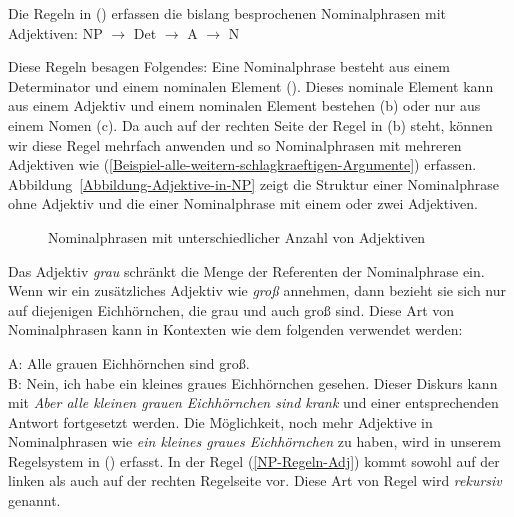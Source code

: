 %
Die Regeln in () erfassen die bislang besprochenen Nominalphrasen mit Adjektiven:
\eal
\label{NP-Regeln}
\ex NP $\to$ Det \nbar
\ex\label{NP-Regeln-Adj} \nbar $\to$ A \nbar
\ex\label{NP-Regeln-Nbar-N} \nbar $\to$ N
\zl

\noindent
Diese Regeln besagen Folgendes: Eine Nominalphrase besteht aus einem Determinator und einem nominalen Element (\nbar). Dieses nominale Element
kann aus einem Adjektiv und einem nominalen Element bestehen (b) oder nur aus einem Nomen (c). Da \nbar auch auf der rechten Seite
der Regel in (b) steht, können wir diese Regel mehrfach anwenden und so Nominalphrasen mit mehreren Adjektiven wie
(\ref{Beispiel-alle-weitern-schlagkraeftigen-Argumente}) erfassen. Abbildung~\vref{Abbildung-Adjektive-in-NP} zeigt die Struktur einer Nominalphrase
ohne Adjektiv und die einer Nominalphrase mit einem oder zwei Adjektiven.
\begin{figure}
\hfill
{}
%
\hfill
{}
%
\caption{\label{Abbildung-Adjektive-in-NP}Nominalphrasen mit unterschiedlicher Anzahl von Adjektiven}
\end{figure}%
Das Adjektiv \emph{grau} schränkt die Menge der Referenten der Nominalphrase ein. Wenn wir ein
zusätzliches Adjektiv wie \emph{groß} annehmen, dann bezieht sie sich nur auf diejenigen Eichhörnchen, die grau
und auch groß sind. Diese Art von Nominalphrasen kann in Kontexten wie dem folgenden verwendet werden:

\ea
\label{Beispiel-Iteration-Adjektive}
A: Alle grauen Eichhörnchen sind groß.\\
B: Nein, ich habe ein kleines graues Eichhörnchen gesehen.
\z
Dieser Diskurs kann mit \emph{Aber alle kleinen grauen Eichhörnchen
  sind krank} und einer entsprechenden Antwort fortgesetzt werden. Die Möglichkeit,
  noch mehr Adjektive in Nominalphrasen wie \emph{ein kleines graues Eichhörnchen} zu haben,
  wird in unserem Regelsystem in () erfasst. In der Regel
  (\ref{NP-Regeln-Adj}) kommt \nbar sowohl auf der linken als auch auf der rechten
  Regelseite vor. Diese Art von Regel wird \emph{rekursiv} genannt.

